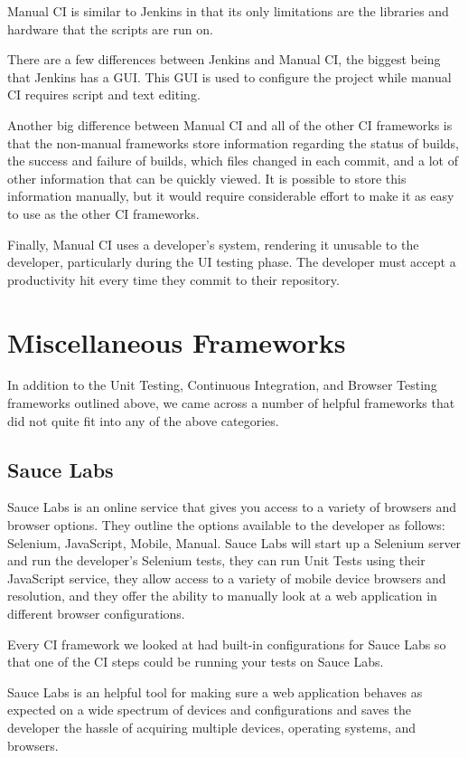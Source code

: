 \documentclass[12pt]{ucthesis}
\begin{document}
Manual CI is similar to Jenkins in that its only limitations are the libraries and hardware that the scripts are run on.

There are a few differences between Jenkins and Manual CI, the biggest being that Jenkins has a GUI. This GUI is used to configure the project while manual CI requires script and text editing. 

Another big difference between Manual CI and all of the other CI frameworks is that the non-manual frameworks store information regarding the status of builds, the success and failure of builds, which files changed in each commit, and a lot of other information that can be quickly viewed. It is possible to store this information manually, but it would require considerable effort to make it as easy to use as the other CI frameworks.

Finally, Manual CI uses a developer's system, rendering it unusable to the developer, particularly during the UI testing phase. The developer must accept a productivity hit every time they commit to their repository.

\section{Miscellaneous Frameworks}
In addition to the Unit Testing, Continuous Integration, and Browser Testing frameworks outlined above, we came across a number of helpful frameworks that did not quite fit into any of the above categories.

\subsection{Sauce Labs}
Sauce Labs \cite{SauceLabs} is an online service that gives you access to a variety of browsers and browser options. They outline the options available to the developer as follows: Selenium, JavaScript, Mobile, Manual. Sauce Labs will start up a Selenium server and run the developer's Selenium tests, they can run Unit Tests using their JavaScript service, they allow access to a variety of mobile device browsers and resolution, and they offer the ability to manually look at a web application in different browser configurations.

Every CI framework we looked at had built-in configurations for Sauce Labs so that one of the CI steps could be running your tests on Sauce Labs.

Sauce Labs is an helpful tool for making sure a web application behaves as expected on a wide spectrum of devices and configurations and saves the developer the hassle of acquiring multiple devices, operating systems, and browsers.
\end{document}
